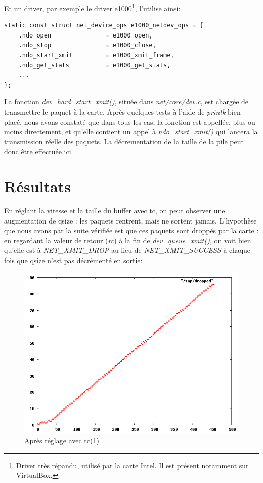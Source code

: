 \documentclass[a4paper]{article}
\begin{document}
Et un driver, par exemple le driver e1000\footnote{Driver très répandu,
utilisé par la carte Intel. Il est présent notamment sur VirtualBox.},
l'utilise ainsi:
\begin{verbatim}
static const struct net_device_ops e1000_netdev_ops = {
    .ndo_open               = e1000_open,
    .ndo_stop               = e1000_close,
    .ndo_start_xmit         = e1000_xmit_frame,
    .ndo_get_stats          = e1000_get_stats,
    ...
};
\end{verbatim}

La fonction \textit{dev\_hard\_start\_xmit()}, située dans
\textit{net/core/dev.c}, est chargée de transmettre le paquet
à la carte. Après quelques tests à l'aide de \textit{printk} bien
placé, nous avons constaté que dans tous les cas, la fonction
est appellée, plus ou moins directement, et qu'elle contient 
un appel à \textit{ndo\_start\_xmit()} qui lancera la transmission réelle des paquets. La décrementation de la
taille de la pile peut donc être effectuée ici.

\section{Résultats}
En réglant la vitesse et la taille du buffer avec tc, on peut observer
une augmentation de qsize : les paquets rentrent, mais ne sortent jamais.
L'hypothèse que nous avons par la suite vérifiée est que ces paquets
sont droppés par la carte : en regardant la valeur de retour (\textit{rc}) à
la  fin de \textit{dev\_queue\_xmit()}, on voit bien  qu'elle est à
\textit{NET\_XMIT\_DROP} au lieu de \textit{NET\_XMIT\_SUCCESS} à chaque
fois que qsize n'est pas décrémenté
en sortie:
\begin{figure}[!ht]
	\centering
	\includegraphics[scale=.5]{dropped.png}
	\caption{\label{dropped} Après réglage avec tc(1)}
\end{figure}
\end{document}

